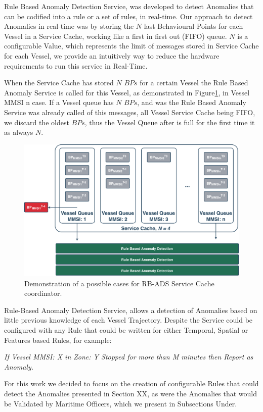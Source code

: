Rule Based Anomaly Detection Service, was developed to detect Anomalies that can be codified into a rule or a set of rules, in real-time. 
Our approach to detect Anomalies in real-time was by storing the $N$ last Behavioural Points for each Vessel in a Service Cache, working like a first in first out (FIFO) queue. $N$ is a configurable Value, which represents the limit of messages stored in Service Cache for each Vessel, we provide an intuitively way to reduce the hardware requirements to run this service in Real-Time.

When the Service Cache has stored $N$ $BPs$ for a certain Vessel the Rule Based Anomaly Service is called for this Vessel, as demonstrated in Figure\ref{fig: RB-ADS}, in Vessel MMSI n case.
If a Vessel queue has $N$ $BPs$, and was the Rule Based Anomaly Service was already called of this messages, all Vessel Service Cache being FIFO, we discard the oldest $BPs$, thus the Vessel Queue after is full for the first time it as always $N$.

\begin{figure}[H]
\centering
\includegraphics[scale = .36]{figures/Ch4/RB-ADS.pdf}
\caption{Demonstration of a possible cases for RB-ADS Service Cache coordinator.}
\label{fig: RB-ADS}
\end{figure}

Rule-Based Anomaly Detection Service, allows a detection of Anomalies based on little previous knowledge of each Vessel Trajectory. Despite the Service could be configured with any Rule that could be written for either Temporal, Spatial or Features based Rules, for example:

\textit{If Vessel MMSI: X in Zone: Y Stopped for more than M minutes then Report as Anomaly.}

For this work we decided to focus on the creation of configurable Rules that could detect the Anomalies presented in Section XX, as were the Anomalies that would be Validated by Maritime Officers,  which we present in Subsections Under.

